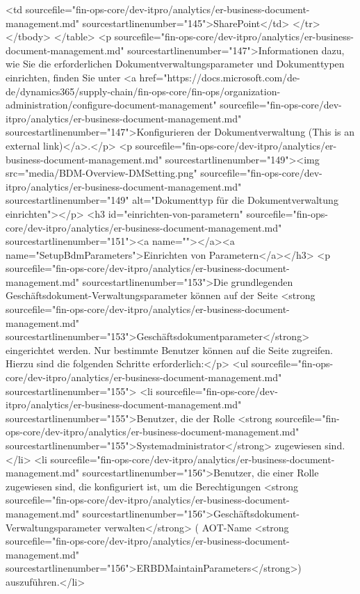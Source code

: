 <td sourcefile="fin-ops-core/dev-itpro/analytics/er-business-document-management.md" sourcestartlinenumber="145">SharePoint</td>
</tr>
</tbody>
</table>
<p sourcefile="fin-ops-core/dev-itpro/analytics/er-business-document-management.md" sourcestartlinenumber="147">Informationen dazu, wie Sie die erforderlichen Dokumentverwaltungsparameter und Dokumenttypen einrichten, finden Sie unter <a href="https://docs.microsoft.com/de-de/dynamics365/supply-chain/fin-ops-core/fin-ops/organization-administration/configure-document-management" sourcefile="fin-ops-core/dev-itpro/analytics/er-business-document-management.md" sourcestartlinenumber="147">Konfigurieren der Dokumentverwaltung (This is an external link)</a>.</p>
<p sourcefile="fin-ops-core/dev-itpro/analytics/er-business-document-management.md" sourcestartlinenumber="149"><img src="media/BDM-Overview-DMSetting.png" sourcefile="fin-ops-core/dev-itpro/analytics/er-business-document-management.md" sourcestartlinenumber="149" alt="Dokumenttyp für die Dokumentverwaltung einrichten"></p>
<h3 id="einrichten-von-parametern" sourcefile="fin-ops-core/dev-itpro/analytics/er-business-document-management.md" sourcestartlinenumber="151"><a name=""></a><a name="SetupBdmParameters">Einrichten von Parametern</a></h3>
<p sourcefile="fin-ops-core/dev-itpro/analytics/er-business-document-management.md" sourcestartlinenumber="153">Die grundlegenden Geschäftsdokument-Verwaltungsparameter können auf der Seite <strong sourcefile="fin-ops-core/dev-itpro/analytics/er-business-document-management.md" sourcestartlinenumber="153">Geschäftsdokumentparameter</strong> eingerichtet werden. Nur bestimmte Benutzer können auf die Seite zugreifen. Hierzu sind die folgenden Schritte erforderlich:</p>
<ul sourcefile="fin-ops-core/dev-itpro/analytics/er-business-document-management.md" sourcestartlinenumber="155">
<li sourcefile="fin-ops-core/dev-itpro/analytics/er-business-document-management.md" sourcestartlinenumber="155">Benutzer, die der Rolle <strong sourcefile="fin-ops-core/dev-itpro/analytics/er-business-document-management.md" sourcestartlinenumber="155">Systemadministrator</strong> zugewiesen sind.</li>
<li sourcefile="fin-ops-core/dev-itpro/analytics/er-business-document-management.md" sourcestartlinenumber="156">Benutzer, die einer Rolle zugewiesen sind, die konfiguriert ist, um die Berechtigungen <strong sourcefile="fin-ops-core/dev-itpro/analytics/er-business-document-management.md" sourcestartlinenumber="156">Geschäftsdokument-Verwaltungsparameter verwalten</strong> ( AOT-Name <strong sourcefile="fin-ops-core/dev-itpro/analytics/er-business-document-management.md" sourcestartlinenumber="156">ERBDMaintainParameters</strong>) auszuführen.</li>
